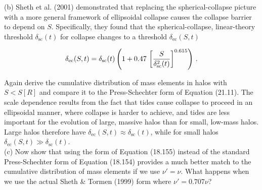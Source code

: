 \documentclass[12pt]{article}
\begin{document}
(b) Sheth et al. (2001) demonstrated that replacing the spherical-collapse picture with a more general framework of ellipsoidal collapse causes the collapse barrier to depend on $S$. Specifically, they found that the spherical-collapse, linear-theory threshold $\delta_\mathrm{sc}(t)$ for collapse changes to a threshold  $\delta_\mathrm{ec}(S,t)$
       
\begin{equation}
    \delta_{\mathrm{ec}}(S,t)= \delta_{\mathrm{sc}}(t)\left(1+0.47\,\left[{S \over \delta_{\mathrm{sc}}^2(t)}\right]^{0.615}\right)\,.
\end{equation}
            
Again derive the cumulative distribution of mass elements in halos with $S < S[R]$ and compare it to the Press-Schechter form of Equation (21.11). The scale dependence results from the fact that tides cause collapse to proceed in an ellipsoidal manner, where collapse is harder to achieve, and tides are less important for the evolution of large, massive halos than for small, low-mass halos. Large halos therefore have $\delta_{\mathrm{ec}}(S,t) \approx \delta_\mathrm{sc}(t)$, while for small halos $\delta_{\mathrm{ec}}(S,t) \gg \delta_\mathrm{sc}(t)$.\\
          
(c) Now show that using the form of Equation (18.155) instead of the standard Press-Schechter form of Equation (18.154) provides a much better match to the cumulative distribution of mass elements if we use $\nu'=\nu$. What happens when we use the actual Sheth \& Tormen (1999) form where $\nu' = 0.707\nu$?
\end{document}

